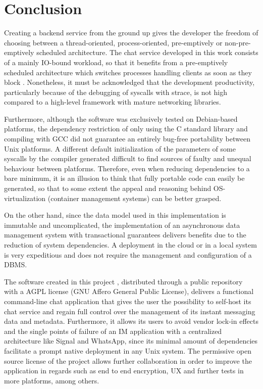 \section{Conclusion}
Creating a backend service from the ground up gives the developer the freedom of choosing between a thread-oriented, process-oriented, pre-emptively or non-pre-emptively scheduled architecture. The chat service developed in this work consists of a mainly IO-bound workload, so that it benefits from a pre-emptively scheduled architecture which switches processes handling clients as soon as they block \cite{Kennedy2018}. Nonetheless, it must be acknowledged that the development productivity, particularly because of the debugging of syscalls with strace, is not high compared to a high-level framework with mature networking libraries.

Furthermore, although the software was exclusively tested on Debian-based platforms, the dependency restriction of only using the C standard library and compiling with GCC did not guarantee an entirely bug-free portability between Unix platforms. A different default initialization of the parameters of some syscalls by the compiler generated difficult to find sources of faulty and unequal behaviour between platforms. Therefore, even when reducing dependencies to a bare minimum, it is an illusion to think that fully portable code can easily be generated, so that to some extent the appeal and reasoning behind OS-virtualization (container management systems) can be better grasped.

On the other hand, since the data model used in this implementation is immutable and uncomplicated, the implementation of an asynchronous data management system with transactional guarantees delivers benefits due to the reduction of system dependencies. A deployment in the cloud or in a local system is very expeditious and does not require the management and configuration of a DBMS.

The software created in this project \cite{Rodriguez2022}, distributed through a public repository with a AGPL license (GNU Affero General Public License), delivers a functional command-line chat application that gives the user the possibility to self-host its chat service and regain full control over the management of its instant messaging data and metadata. Furthermore, it allows its users to avoid vendor lock-in effects and the single points of failure of an IM application with a centralized architecture like Signal and WhatsApp, since its minimal amount of dependencies facilitate a prompt native deployment in any Unix system. The permissive open source license of the project allows further collaboration in order to improve the application in regards such as end to end encryption, UX and further tests in more platforms, among others.